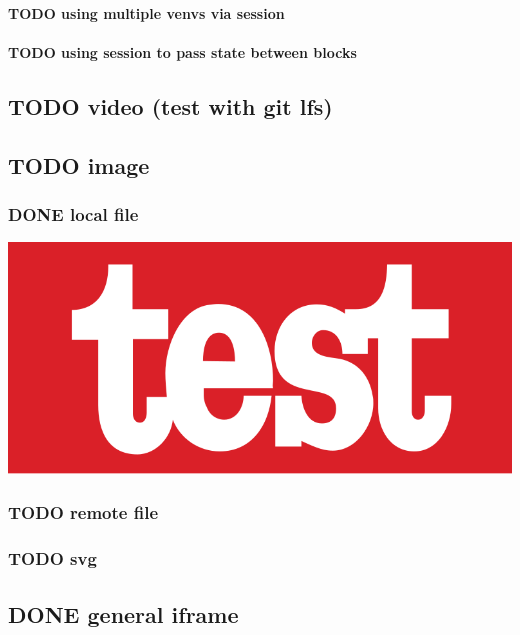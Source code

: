 \documentclass[11pt]{article}
\begin{document}
\paragraph{{\bfseries\sffamily TODO} using multiple venvs via session}
\label{sec:org8ee4691}
\paragraph{{\bfseries\sffamily TODO} using session to pass state between blocks}
\label{sec:org79b4c1e}
\subsection{{\bfseries\sffamily TODO} video (test with git lfs)}
\label{sec:org5b3a027}
\subsection{{\bfseries\sffamily TODO} image}
\label{sec:orge89f838}
\subsubsection{{\bfseries\sffamily DONE} local file}
\label{sec:orgc013252}
\begin{center}
\includegraphics[width=.9\linewidth]{./images/test-image.png}
\end{center}
\subsubsection{{\bfseries\sffamily TODO} remote file}
\label{sec:orge367d97}
\subsubsection{{\bfseries\sffamily TODO} svg}
\label{sec:org18054bb}
\subsection{{\bfseries\sffamily DONE} general iframe}
\label{sec:org3e5badf}
\end{document}
